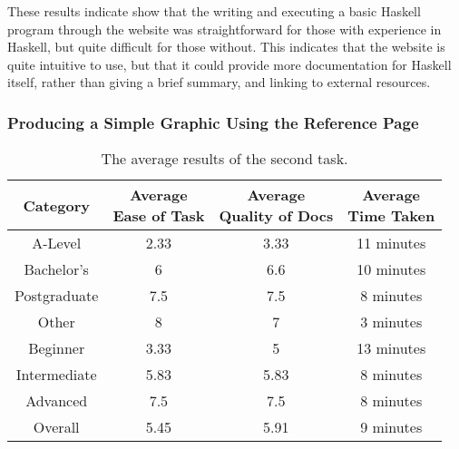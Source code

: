 \documentclass[../main.tex]{subfiles}
\begin{document}
                These results indicate show that the writing and executing a basic Haskell
                    program through the website was straightforward for those with experience in
                    Haskell, but quite difficult for those without.
                This indicates that the website is quite intuitive to use, but that it could
                    provide more documentation for Haskell itself, rather than giving a brief
                    summary, and linking to external resources.

            \subsubsection{Producing a Simple Graphic Using the Reference Page}
                \begin{table}[H]
                    \centering
                    \begin{tabular}{c|c|c|c}
                        \textbf{Category} & \makecell{\textbf{Average}                     \\ \textbf{Ease of Task}}
                                          & \makecell{\textbf{Average}                     \\ \textbf{Quality of Docs}}
                                          & \makecell{\textbf{Average}                     \\ \textbf{Time Taken}} \\
                        \hline
                        A-Level           & 2.33                       & 3.33 & 11 minutes \\
                        Bachelor's        & 6                          & 6.6  & 10 minutes \\
                        Postgraduate      & 7.5                        & 7.5  & 8 minutes  \\
                        Other             & 8                          & 7    & 3 minutes  \\
                        \hline
                        Beginner          & 3.33                       & 5    & 13 minutes \\
                        Intermediate      & 5.83                       & 5.83 & 8 minutes  \\
                        Advanced          & 7.5                        & 7.5  & 8 minutes  \\
                        \hline
                        Overall           & 5.45                       & 5.91 & 9 minutes  \\
                    \end{tabular}
                    \caption{The average results of the second task.}
                \end{table}
\end{document}
